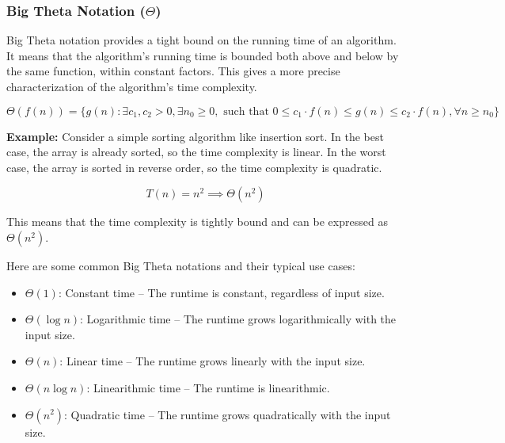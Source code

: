 \documentclass[12pt]{book} %
\begin{document}
\subsubsection{Big Theta Notation ($\Theta$)}

Big Theta notation provides a tight bound on the running time of an algorithm. It means that the algorithm's running time is bounded both above and below by the same function, within constant factors. This gives a more precise characterization of the algorithm's time complexity.

\[
\Theta(f(n)) = \{ g(n) : \exists c_1, c_2 > 0, \exists n_0 \geq 0, \text{ such that } 0 \leq c_1 \cdot f(n) \leq g(n) \leq c_2 \cdot f(n), \forall n \geq n_0 \}
\]

\textbf{Example:} Consider a simple sorting algorithm like insertion sort. In the best case, the array is already sorted, so the time complexity is linear. In the worst case, the array is sorted in reverse order, so the time complexity is quadratic.

\[
T(n) = n^2 \implies \Theta(n^2)
\]

This means that the time complexity is tightly bound and can be expressed as $\Theta(n^2)$.


Here are some common Big Theta notations and their typical use cases:
\begin{itemize}
    \item $\Theta(1)$: Constant time – The runtime is constant, regardless of input size.
    \item $\Theta(\log n)$: Logarithmic time – The runtime grows logarithmically with the input size.
    \item $\Theta(n)$: Linear time – The runtime grows linearly with the input size.
    \item $\Theta(n \log n)$: Linearithmic time – The runtime is linearithmic.
    \item $\Theta(n^2)$: Quadratic time – The runtime grows quadratically with the input size.
\end{itemize}
\end{document}

